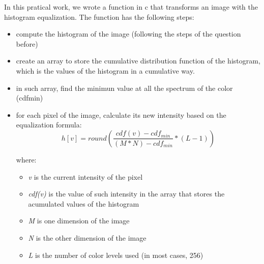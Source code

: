 \documentclass{article}
\begin{document}
	In this pratical work, we wrote a function in c that transforms an image with the histogram equalization. The function has the following steps:
	\begin{itemize}
  		\item compute the histogram of the image (following the steps of the question before)
  		\item create an array to store the cumulative distribution function of the histogram, which is the values of the histogram in a cumulative way.
  		\item in such array, find the minimun value at all the spectrum of the color (cdfmin)
  		\item for each pixel of the image, calculate its new intensity based on the equalization formula:
			\begin{equation}
				h[v]= round \left( \frac{cdf(v)-cdf_{min}}{(M * N) - cdf_{min}} * (L-1) \right) 
			\label{eq:equalization}
			\end{equation}
			
			where:		
			\begin{itemize}
	  			\item {\it v} is the current intensity of the pixel		
		  		\item {\it cdf(v)} is the value of such intensity in the array that stores the acumulated values of the histogram
		  		\item {\it M} is one dimension of the image		
		  		\item {\it N} is the other dimension of the image
		  		\item {\it L} is the number of color levels used (in most cases, 256)
			\end{itemize}
	\end{itemize}
\end{document}
